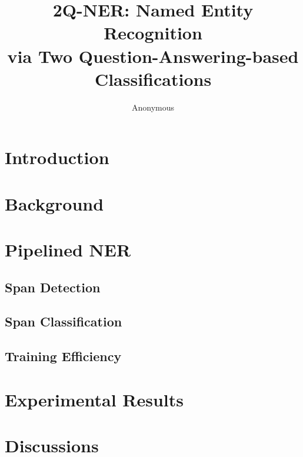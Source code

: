 \documentclass[letterpaper]{article} %
\title{2Q-NER: Named Entity Recognition \\ via Two Question-Answering-based Classifications}
\author {
    Anonymous
}
\begin{document}
\maketitle
\begin{abstract}

\end{abstract}

\section{Introduction}
\label{sec:intro}


\section{Background}
\label{sec:background}


\section{Pipelined NER}
\label{sec:method}


\subsection{Span Detection}
\label{sec:span}


\subsection{Span Classification}
\label{sec:class}


\subsection{Training Efficiency}
\label{sec:training_efficiency}


% 

\section{Experimental Results}
\label{sec:exp}


\section{Discussions}
\label{sec:discussion}

\end{document}
